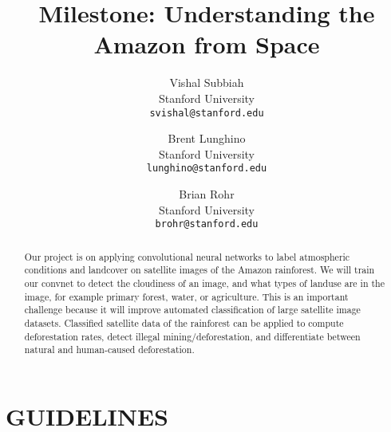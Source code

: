 \documentclass[10pt,twocolumn,letterpaper]{article}
\begin{document}
\title{Milestone: Understanding the Amazon from Space}

\author{Vishal Subbiah\\
Stanford University\\
{\tt\small svishal@stanford.edu}
\and
Brent Lunghino\\
Stanford University\\
{\tt\small lunghino@stanford.edu}
\and
Brian Rohr\\
Stanford University\\
{\tt\small brohr@stanford.edu}
}

\maketitle

\begin{abstract}
   Our project is on applying convolutional neural networks to label atmospheric conditions and landcover on satellite images of the Amazon rainforest. We will train our convnet to detect the cloudiness of an image, and what types of landuse are in the image, for example primary forest, water, or agriculture. This is an important challenge because it will improve automated classification of large satellite image datasets. Classified satellite data of the rainforest can be applied to compute deforestation rates, detect illegal mining/deforestation, and differentiate between natural and human-caused deforestation.
\end{abstract}

\section{GUIDELINES}
\end{document}
